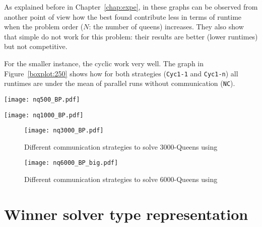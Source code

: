 As explained before in Chapter~\ref{chap:expe}, in these graphs can be observed from another point of view how the best found \commstr{} contribute less in terms of runtime when the problem order ($N$: the number of queens) increases. They also show that simple \commstrs{} do not work for this problem: their results are better (lower runtimes) but not competitive.

For the smaller instance, the cyclic \commstr{} work very well. The graph in Figure~\ref{boxplot:250} shows how for both strategies (\texttt{Cyc1-1} and \texttt{Cyc1-n}) all runtimes are under the mean of parallel runs without communication (\texttt{NC}).


\begin{minipage}[c]{0.45\textwidth}
\centering
\texttt{[image: nq500\_BP.pdf]}
\label{boxplot:500}
\end{minipage}\hspace{0.05\textwidth}
\begin{minipage}[c]{0.45\textwidth}
\centering
\texttt{[image: nq1000\_BP.pdf]}
\label{boxplot:1000}
\end{minipage}

\begin{figure}[!h]
\centering
\texttt{[image: nq3000\_BP.pdf]}
\caption{Different communication strategies to solve 3000-Queens using \posl}\label{boxplot:3000}
\end{figure}

\begin{figure}[!h]
\centering
\texttt{[image: nq6000\_BP\_big.pdf]}
\caption{Different communication strategies to solve 6000-Queens using \posl}\label{boxplot:6000}
\end{figure}

\newpage

\section{Winner solver type representation}

